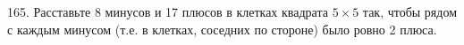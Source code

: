 165. Расставьте 8 минусов и 17 плюсов в клетках квадрата $5\times5$ так, чтобы рядом с каждым минусом (т.е. в клетках, соседних по стороне) было ровно 2 плюса.\\

